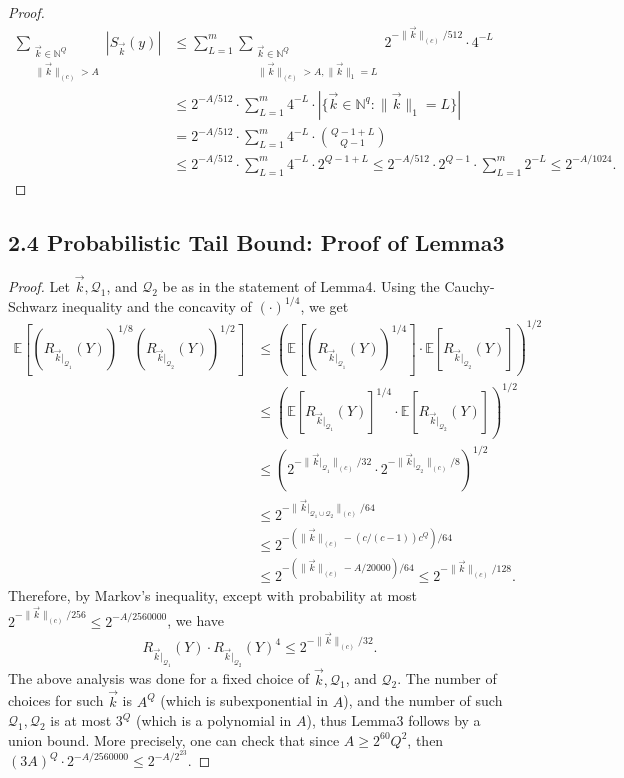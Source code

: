 \begin{proof}
\begin{align*}
\sum_{\substack{\vec k\in\mathbb N^Q\\\|\vec k\|_{(c)}>A}}|S_{\vec k}(y)|
&\le\sum_{L=1}^m\sum_{\substack{\vec k\in\mathbb N^Q\\\|\vec k\|_{(c)}>A,\|\vec k\|_1=L}}2^{-\|\vec k\|_{(c)}/512}\cdot4^{-L}\\
&\le2^{-A/512}\cdot\sum_{L=1}^m4^{-L}\cdot|\{\vec k\in\mathbb N^q:\|\vec k\|_1=L\}|\\
&=2^{-A/512}\cdot\sum_{L=1}^m4^{-L}\cdot\binom{Q-1+L}{Q-1}\\
&\le2^{-A/512}\cdot\sum_{L=1}^m4^{-L}\cdot2^{Q-1+L}
\le2^{-A/512}\cdot2^{Q-1}\cdot\sum_{L=1}^m2^{-L}\le2^{-A/1024}.
\end{align*}
\end{proof}
\subsection*{2.4 Probabilistic Tail Bound: Proof of Lemma3}
\begin{proof}
Let $\vec k,\mathcal Q_1$, and $\mathcal Q_2$ be as in the statement of Lemma4. Using the Cauchy-Schwarz inequality and the concavity of $(\cdot)^{1/4}$, we get
\begin{align*}
\mathbb E[(R_{\vec k|_{\mathcal Q_1}}(Y))^{1/8}(R_{\vec k|_{\mathcal Q_2}}(Y))^{1/2}]
&\le\left(\mathbb E[(R_{\vec k|_{\mathcal Q_1}}(Y))^{1/4}]\cdot\mathbb E[R_{\vec k|_{\mathcal Q_2}}(Y)]\right)^{1/2}\\
&\le\left(\mathbb E[R_{\vec k|_{\mathcal Q_1}}(Y)]^{1/4}\cdot\mathbb E[R_{\vec k|_{\mathcal Q_2}}(Y)]\right)^{1/2}\\
&\le(2^{-\|\vec k|_{\mathcal Q_1}\|_{(c)}/32}\cdot2^{-\|\vec k|_{\mathcal Q_2}\|_{(c)}/8})^{1/2}\\
&\le2^{-\|\vec k|_{\mathcal Q_1\cup\mathcal Q_2}\|_{(c)}/64}\\
&\le2^{-(\|\vec k\|_{(c)}-(c/(c-1))c^Q)/64}\\
&\le2^{-(\|\vec k\|_{(c)}-A/20000)/64}\le2^{-\|\vec k\|_{(c)}/128}.
\end{align*}
Therefore, by Markov's inequality, except with probability at most $2^{-\|\vec k\|_{(c)}/256}\le2^{-A/2560000}$, we have
\[
R_{\vec k|_{\mathcal Q_1}}(Y)\cdot R_{\vec k|_{\mathcal Q_2}}(Y)^4\le2^{-\|\vec k\|_{(c)}/32}.
\]
The above analysis was done for a fixed choice of $\vec k,\mathcal Q_1$, and $\mathcal Q_2$. The number of choices for such $\vec k$ is $A^Q$ (which is subexponential in $A$), and the number of such $\mathcal Q_1,\mathcal Q_2$ is at most $3^Q$ (which is a polynomial in $A$), thus Lemma3 follows by a union bound. More precisely, one can check that since $A\ge2^{60}Q^2$, then $(3A)^Q\cdot2^{-A/2560000}\le2^{-A/2^{23}}$.
\end{proof}
